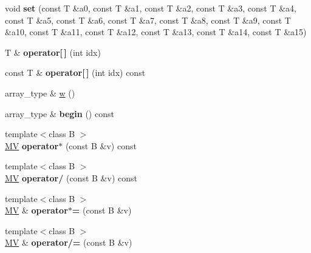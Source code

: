 \begin{DoxyCompactItemize}
\item 
\hypertarget{classvsr_1_1_m_v_aa8c38c7bc2e373a86b2837e24d98f39f}{void {\bfseries set} (const T \&a0, const T \&a1, const T \&a2, const T \&a3, const T \&a4, const T \&a5, const T \&a6, const T \&a7, const T \&a8, const T \&a9, const T \&a10, const T \&a11, const T \&a12, const T \&a13, const T \&a14, const T \&a15)}\label{classvsr_1_1_m_v_aa8c38c7bc2e373a86b2837e24d98f39f}

\item 
\hypertarget{classvsr_1_1_m_v_a7896f2a1b6e0b2948a50dd874a689690}{T \& {\bfseries operator\mbox{[}$\,$\mbox{]}} (int idx)}\label{classvsr_1_1_m_v_a7896f2a1b6e0b2948a50dd874a689690}

\item 
\hypertarget{classvsr_1_1_m_v_a9b4982ba40ed85cf9c9eb760198a53c7}{const T \& {\bfseries operator\mbox{[}$\,$\mbox{]}} (int idx) const }\label{classvsr_1_1_m_v_a9b4982ba40ed85cf9c9eb760198a53c7}

\item 
array\-\_\-type \& \hyperlink{classvsr_1_1_m_v_a076029a865f595ba58f76f85a7f55a30}{w} ()
\item 
\hypertarget{classvsr_1_1_m_v_a78cf07f466f1655c429ad854d7816717}{array\-\_\-type \& {\bfseries begin} () const }\label{classvsr_1_1_m_v_a78cf07f466f1655c429ad854d7816717}

\item 
\hypertarget{classvsr_1_1_m_v_a71bd1904d6627dabbd2e33ca6ea14bd2}{{\footnotesize template$<$class B $>$ }\\\hyperlink{classvsr_1_1_m_v}{M\-V} {\bfseries operator$\ast$} (const B \&v) const }\label{classvsr_1_1_m_v_a71bd1904d6627dabbd2e33ca6ea14bd2}

\item 
\hypertarget{classvsr_1_1_m_v_ad391eb9c1fcd3df43d90318a6dbcac68}{{\footnotesize template$<$class B $>$ }\\\hyperlink{classvsr_1_1_m_v}{M\-V} {\bfseries operator/} (const B \&v) const }\label{classvsr_1_1_m_v_ad391eb9c1fcd3df43d90318a6dbcac68}

\item 
\hypertarget{classvsr_1_1_m_v_a2af82445b59f7010cd5eecb4dacf9e2b}{{\footnotesize template$<$class B $>$ }\\\hyperlink{classvsr_1_1_m_v}{M\-V} \& {\bfseries operator$\ast$=} (const B \&v)}\label{classvsr_1_1_m_v_a2af82445b59f7010cd5eecb4dacf9e2b}

\item 
\hypertarget{classvsr_1_1_m_v_a18c2e1bb769f0ef3c2f0d191fdb569f7}{{\footnotesize template$<$class B $>$ }\\\hyperlink{classvsr_1_1_m_v}{M\-V} \& {\bfseries operator/=} (const B \&v)}\label{classvsr_1_1_m_v_a18c2e1bb769f0ef3c2f0d191fdb569f7}


\end{DoxyCompactItemize}
